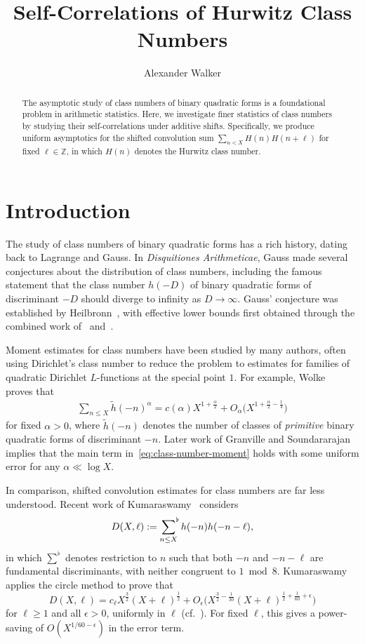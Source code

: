 \documentclass[11pt,reqno]{amsart}
\title{Self-Correlations of Hurwitz Class Numbers}
\author{Alexander Walker}
\theoremstyle{plain}
\theoremstyle{definition}
\numberwithin{equation}{section}
\begin{document}
\begin{abstract}
The asymptotic study of class numbers of binary quadratic forms is a foundational problem in arithmetic statistics. Here, we investigate finer statistics of class numbers by studying their self-correlations under additive shifts. Specifically, we produce uniform asymptotics for the shifted convolution sum $\sum_{n < X} H(n) H(n+\ell)$ for fixed $\ell \in \mathbb{Z}$, in which $H(n)$ denotes the Hurwitz class number. 
\end{abstract}

\maketitle

\section{Introduction}

The study of class numbers of binary quadratic forms has a rich history, dating back to Lagrange and Gauss. In \emph{Disquitiones Arithmeticae}, Gauss made several conjectures about the distribution of class numbers, including the famous statement that the class number $h(-D)$ of binary quadratic forms of discriminant $-D$ should diverge to infinity as $D \to \infty$. Gauss' conjecture was established by Heilbronn~\cite{Heilbronn34}, with effective lower bounds first obtained through the combined work of~\cite{Goldfeld76} and~\cite{GrossZagier83}.

Moment estimates for class numbers have been studied by many authors, often using Dirichlet's class number to reduce the problem to estimates for families of quadratic Dirichlet $L$-functions at the special point $1$. For example, Wolke~\cite{Wolke72} proves that
\begin{align} \label{eq:class-number-moment}
	\sum_{n \leq X} \widetilde{h}(-n)^\alpha = c(\alpha) X^{1+\frac{\alpha}{2}} 
	+ O_\alpha\big(X^{1+\frac{\alpha}{2} - \frac{1}{4}}\big)
\end{align}
for fixed $\alpha > 0$, where $\widetilde{h}(-n)$ denotes the number of classes of \emph{primitive} binary quadratic forms of discriminant $-n$.  Later work of Granville and Soundararajan~\cite{GranvilleSoundararajan03} implies that the main term in~\eqref{eq:class-number-moment} holds with some uniform error for any $\alpha \ll \log X$.

In comparison, shifted convolution estimates for class numbers are far less understood. Recent work of Kumaraswamy~\cite{Kumaraswamy18} considers
\[
	D(X,\ell) := \sideset{}{^\flat}\sum_{n \leq X} h(-n) h(-n-\ell),
\]
in which $\sum^\flat$ denotes restriction to $n$ such that both $-n$ and $-n-\ell$ are fundamental discriminants, with neither congruent to $1 \bmod 8$. Kumaraswamy applies the circle method to prove that
\[
	D(X,\ell) = c_\ell X^{\frac{3}{2}}(X+\ell)^\frac{1}{2}
		+ O_\epsilon\big( X^{\frac{3}{2} - \frac{1}{30}} (X+ \ell)^{\frac{1}{2} + \frac{1}{60} + \epsilon}\big)
\]
for $\ell \geq 1$ and all $\epsilon > 0$, uniformly in $\ell$ (cf.~\cite[Theorem 1.1]{Kumaraswamy18}). For fixed $\ell$, this gives a power-saving of $O(X^{1/60-\epsilon})$ in the error term.
\end{document}
